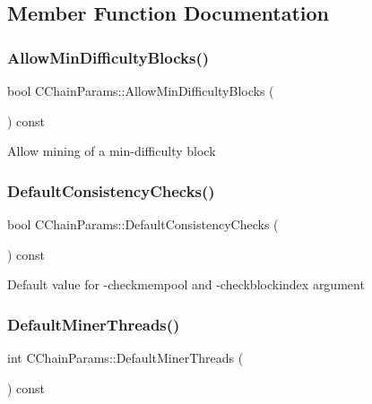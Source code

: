 \subsection{Member Function Documentation}
\mbox{\label{class_c_chain_params_ac1202f87305ff3fdd4e1da28f1b35218}} 
\subsubsection{\texorpdfstring{Allow\+Min\+Difficulty\+Blocks()}{AllowMinDifficultyBlocks()}}
{\footnotesize\ttfamily bool C\+Chain\+Params\+::\+Allow\+Min\+Difficulty\+Blocks (\begin{DoxyParamCaption}{ }\end{DoxyParamCaption}) const\hspace{0.3cm}{\ttfamily [inline]}}

Allow mining of a min-\/difficulty block \mbox{\label{class_c_chain_params_a1d12f9b4b1ea7d7a0416cb6045496342}} 
\subsubsection{\texorpdfstring{Default\+Consistency\+Checks()}{DefaultConsistencyChecks()}}
{\footnotesize\ttfamily bool C\+Chain\+Params\+::\+Default\+Consistency\+Checks (\begin{DoxyParamCaption}{ }\end{DoxyParamCaption}) const\hspace{0.3cm}{\ttfamily [inline]}}

Default value for -\/checkmempool and -\/checkblockindex argument \mbox{\label{class_c_chain_params_ac2da912493292c2139ca7753dde96b2e}} 
\subsubsection{\texorpdfstring{Default\+Miner\+Threads()}{DefaultMinerThreads()}}
{\footnotesize\ttfamily int C\+Chain\+Params\+::\+Default\+Miner\+Threads (\begin{DoxyParamCaption}{ }\end{DoxyParamCaption}) const\hspace{0.3cm}{\ttfamily [inline]}}

